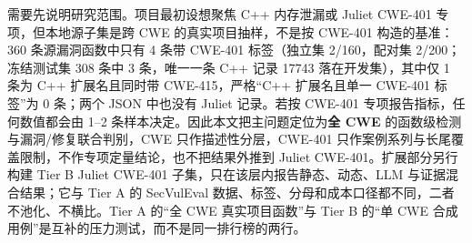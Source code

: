\documentclass[conference]{IEEEtran}
\begin{document}
需要先说明研究范围。项目最初设想聚焦 C++ 内存泄漏或 Juliet CWE-401 专项，但本地源子集是跨 CWE 的真实项目抽样，不是按 CWE-401 构造的基准：360 条源漏洞函数中只有 4 条带 CWE-401 标签（独立集 2/160，配对集 2/200；冻结测试集 308 条中 3 条，唯一一条 C++ 记录 17743 落在开发集），其中仅 1 条为 C++ 扩展名且同时带 CWE-415，严格“C++ 扩展名且单一 CWE-401 标签”为 0 条；两个 JSON 中也没有 Juliet 记录。若按 CWE-401 专项报告指标，任何数值都会由 1--2 条样本决定。因此本文把主问题定位为\textbf{全 CWE} 的函数级检测与漏洞/修复联合判别，CWE 只作描述性分层，CWE-401 只作案例系列与长尾覆盖限制，不作专项定量结论，也不把结果外推到 Juliet CWE-401。扩展部分另行构建 Tier B Juliet CWE-401 子集，只在该层内报告静态、动态、LLM 与证据混合结果；它与 Tier A 的 SecVulEval 数据、标签、分母和成本口径都不同，二者不池化、不横比。Tier A 的“全 CWE 真实项目函数”与 Tier B 的“单 CWE 合成用例”是互补的压力测试，而不是同一排行榜的两行。
\end{document}
